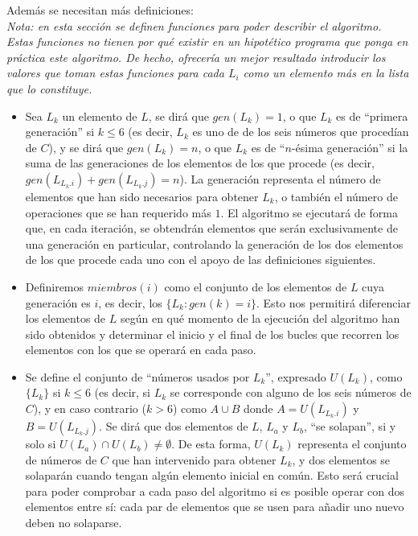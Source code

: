 \documentclass{article}
\begin{document}
Además se necesitan más definiciones:\\
\emph{Nota: en esta sección se definen funciones para poder describir el algoritmo. Estas funciones no tienen por qué existir en un hipotético programa que ponga en práctica este algoritmo. De hecho, ofrecería un mejor resultado introducir los valores que toman estas funciones para cada $L_i$ como un elemento más en la lista que lo constituye.}
\begin{itemize}
	\item Sea $L_k$ un elemento de $L$, se dirá que $gen(L_k) = 1$, o que $L_k$ es de ``primera generación'' si $k \le 6$ (es decir, $L_k$ es uno de de los seis números que procedían de $C$), y se dirá que $gen(L_k) = n$, o que $L_k$ es de ``$n$-ésima generación'' si la suma de las generaciones de los elementos de los que procede (es decir, $gen(L_{L_k.i}) + gen(L_{L_k.j}) = n$). La generación representa el número de elementos que han sido necesarios para obtener $L_k$, o también el número de operaciones que se han requerido más $1$. El algoritmo se ejecutará de forma que, en cada iteración, se obtendrán elementos que serán exclusivamente de una generación en particular, controlando la generación de los dos elementos de los que procede cada uno con el apoyo de las definiciones siguientes.
	
	\item Definiremos $miembros(i)$ como el conjunto de los elementos de $L$ cuya generación es $i$, es decir, los $\{L_k : gen(k) = i\}$. Esto nos permitirá diferenciar los elementos de $L$ según en qué momento de la ejecución del algoritmo han sido obtenidos y determinar el inicio y el final de los bucles que recorren los elementos con los que se operará en cada paso.

	\item Se define el conjunto de ``números usados por $L_k$'', expresado $U(L_k)$, como $\{L_k\}$ si $k \le 6$ (es decir, si $L_k$ se corresponde con alguno de los seis números de $C$), y en caso contrario ($k > 6$) como $A \cup B$ donde $A =U(L_{L_k.i})$ y $B = U(L_{L_k.j})$. Se dirá que dos elementos de $L$, $L_a$ y $L_b$, ``se solapan'', si y solo si $U(L_a) \cap  U(L_b) \ne \emptyset$. De esta forma, $U(L_k)$ representa el conjunto de números de $C$ que han intervenido para obtener $L_k$, y dos elementos se solaparán cuando tengan algún elemento inicial en común. Esto será crucial para poder comprobar a cada paso del algoritmo si es posible operar con dos elementos entre sí: cada par de elementos que se usen para añadir uno nuevo deben no solaparse.
	
\end{itemize}
\end{document}

